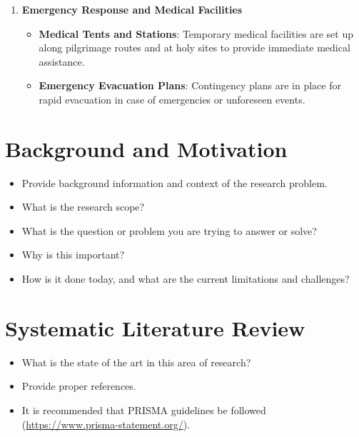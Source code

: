 \documentclass{article}
\begin{document}
\begin{enumerate}
\begin{itemize}
        \item \textbf{Crowd Monitoring}: Surveillance cameras and crowd monitoring systems help authorities identify congested areas and deploy resources accordingly.
    \end{itemize}
    \item \textbf{Emergency Response and Medical Facilities}
    \begin{itemize}
        \item \textbf{Medical Tents and Stations}: Temporary medical facilities are set up along pilgrimage routes and at holy sites to provide immediate medical assistance.
        \item \textbf{Emergency Evacuation Plans}: Contingency plans are in place for rapid evacuation in case of emergencies or unforeseen events.
    \end{itemize}
\end{enumerate}

\section{Background and Motivation}
\begin{itemize}
    \item Provide background information and context of the research problem.
    \item What is the research scope?
    \item What is the question or problem you are trying to answer or solve?
    \item Why is this important?
    \item How is it done today, and what are the current limitations and challenges?
\end{itemize}

\section{Systematic Literature Review}
\begin{itemize}
    \item What is the state of the art in this area of research?
    \item Provide proper references.
    \item It is recommended that PRISMA guidelines be followed (\url{https://www.prisma-statement.org/}).
\end{itemize}
\end{document}
